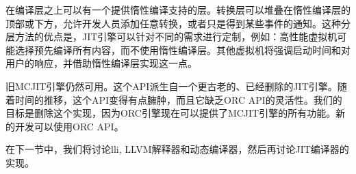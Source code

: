 在编译层之上可以有一个提供惰性编译支持的层。转换层可以堆叠在惰性编译层的顶部或下方，允许开发人员添加任意转换，或者只是得到某些事件的通知。这种分层方法的优点是，JIT引擎可以针对不同的需求进行定制，例如：高性能虚拟机可能选择预先编译所有内容，而不使用惰性编译层。其他虚拟机将强调启动时间和对用户的响应，并借助惰性编译层实现这一点。\par

旧MCJIT引擎仍然可用。这个API派生自一个更古老的、已经删除的JIT引擎。随着时间的推移，这个API变得有点臃肿，而且它缺乏ORC API的灵活性。我们的目标是删除这个实现，因为ORC引擎现在可以提供了MCJIT引擎的所有功能。新的开发可以使用ORC API。\par

在下一节中，我们将讨论lli, LLVM解释器和动态编译器，然后再讨论JIT编译器的实现。\par






























































